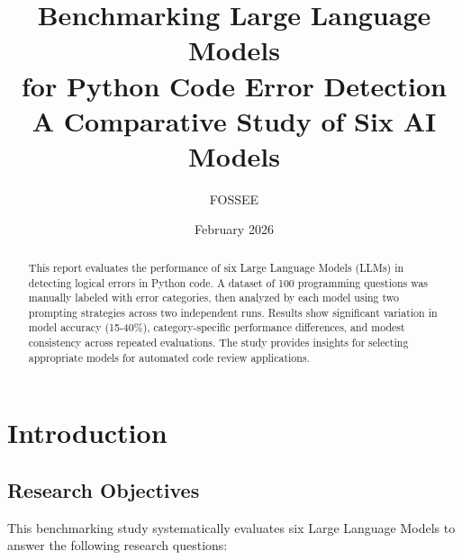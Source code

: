 \documentclass[12pt,a4paper]{article}
\title{\textbf{Benchmarking Large Language Models} \\ 
       \large for Python Code Error Detection \\
       \normalsize A Comparative Study of Six AI Models}
\author{FOSSEE}
\date{February 2026}
\begin{document}
\maketitle

\begin{abstract}
This report evaluates the performance of six Large Language Models (LLMs) in detecting logical errors in Python code. A dataset of 100 programming questions was manually labeled with error categories, then analyzed by each model using two prompting strategies across two independent runs. Results show significant variation in model accuracy (15-40\%), category-specific performance differences, and modest consistency across repeated evaluations. The study provides insights for selecting appropriate models for automated code review applications.
\end{abstract}

\tableofcontents
\newpage

\section{Introduction}

\subsection{Research Objectives}

This benchmarking study systematically evaluates six Large Language Models to answer the following research questions:
\end{document}
